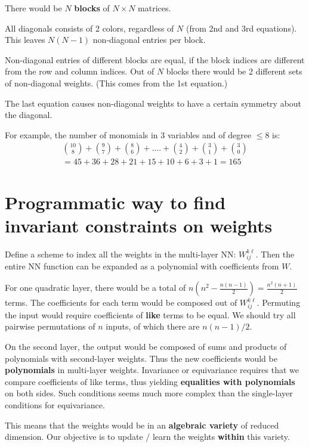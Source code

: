 There would be $N$ \textbf{blocks} of $N \times N$ matrices.

All diagonals consists of 2 colors, regardless of $N$ (from 2nd and 3rd equations).  This leaves $N (N - 1)$ non-diagonal entries per block.

Non-diagonal entries of different blocks are equal, if the block indices are different from the row and column indices.  Out of $N$ blocks there would be 2 different sets of non-diagonal weights.  (This comes from the 1st equation.)

The last equation causes non-diagonal weights to have a certain symmetry about the diagonal.  

For example, the number of monomials in 3 variables and of degree $\le 8$ is:
\begin{eqnarray}
{10\choose8} + {9\choose7} + {8\choose6} + .... + {4\choose2} + {3\choose1} + {3\choose0} \nonumber \\
= 45 + 36 + 28 + 21 + 15 + 10 + 6 + 3 + 1 = 165
\end{eqnarray}

\section{Programmatic way to find invariant constraints on weights}

Define a scheme to index all the weights in the multi-layer NN: $W_{ij}^{k \ell}$.  Then the entire NN function can be expanded as a polynomial with coefficients from $W$.

For one quadratic layer, there would be a total of $\displaystyle n \left( n^2 - \frac{n (n - 1)}{2} \right) = \frac{n^2 (n + 1)}{2}$ terms.  The coefficients for each term would be composed out of $W_{ij}^{k \ell}$.  Permuting the input would require coefficients of \textbf{like} terms to be equal.  We should try all pairwise permutations of $n$ inputs, of which there are $n (n - 1) / 2$.

On the second layer, the output would be composed of sums and products of polynomials with second-layer weights.  Thus the new coefficients would be \textbf{polynomials} in multi-layer weights.  Invariance or equivariance requires that we compare coefficients of like terms, thus yielding \textbf{equalities with polynomials} on both sides.  Such conditions seems much more complex than the single-layer conditions for equivariance.

This means that the weights would be in an \textbf{algebraic variety} of reduced dimension.  Our objective is to update / learn the weights \textbf{within} this variety.  

